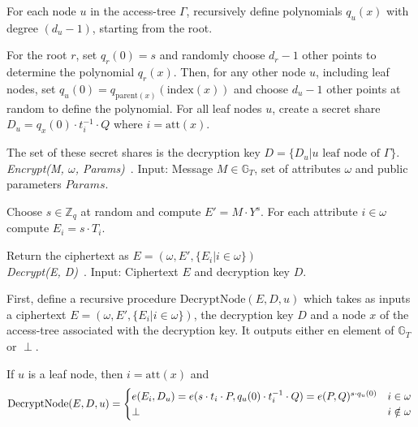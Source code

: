 For each node $u$ in the \gls{access-tree} $\Gamma$, recursively define polynomials $q_u(x)$ with degree $(d_u - 1)$, starting from the root.

For the root $r$, set $q_r(0) = s$ and randomly choose $d_r -1$ other points to determine the polynomial $q_r(x)$.
Then, for any other node $u$, including leaf nodes, set $q_u(0) = q_{\text{parent}(x)}(\text{index}(x))$ and choose $d_u -1$ other points at random to define the polynomial. 
For all leaf nodes $u$, create a secret share $D_u = q_x(0) \cdot t_i^{-1} \cdot Q$ where $i = \text{att}(x)$.

The set of these secret shares is the decryption key $D = \{D_u | u \text{ leaf node of } \Gamma\}$.\\

\emph{Encrypt(M, $\omega$, Params)}~\cite{goyal_attribute-based_2006}.
Input: Message $M \in \mathbb{G}_T$, set of \glspl{attribute} $\omega$ and public parameters $Params$. 

Choose $s \in \mathbb{Z}_q$ at random and compute $E' = M \cdot Y^s$.
For each attribute $i \in \omega$ compute $E_i = s \cdot T_i$.

Return the ciphertext as $E = (\omega, E', \{E_i | i \in \omega\})$
\\

\emph{Decrypt(E, D)}~\cite{goyal_attribute-based_2006}.
Input: Ciphertext $E$ and decryption key $D$.

First, define a recursive procedure $\text{DecryptNode}(E, D, u)$ which takes as inputs a ciphertext $E = (\omega, E', \{E_i | i \in \omega\})$, the decryption key $D$ and a node $x$ of the \gls{access-tree} associated with the decryption key.
It outputs either en element of $\mathbb{G}_T$ or $\perp$.

If $u$ is a leaf node, then $i = \text{att}(x)$ and 
\begin{equation}
    \text{DecryptNode}(E, D, u) = \begin{cases}
        e(E_i, D_u) = e(s \cdot t_i \cdot P, q_u(0) \cdot t_i^{-1} \cdot Q) = e(P, Q)^{s\cdot q_u(0)} & i \in \omega\\
        \perp & i \notin \omega
    \end{cases}\\
\end{equation}

